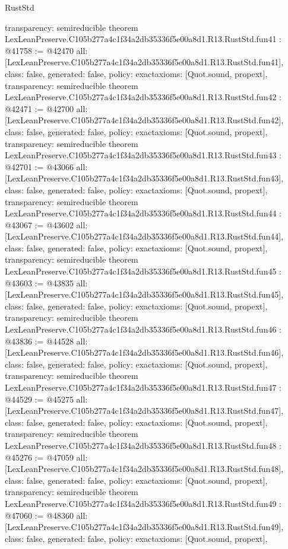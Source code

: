 \begin{lexlean}{RustStd}
\begin{coremodule}
{  transparency: semireducible
}
theorem LexLeanPreserve.C105b277a4c1f34a2db35336f5e00a8d1.R13.RustStd.fun41 : @41758 := @42470 {
  all: [LexLeanPreserve.C105b277a4c1f34a2db35336f5e00a8d1.R13.RustStd.fun41],
  class: false,
  generated: false,
  policy: exact{axioms: [Quot.sound, propext]},
  transparency: semireducible
}
theorem LexLeanPreserve.C105b277a4c1f34a2db35336f5e00a8d1.R13.RustStd.fun42 : @42471 := @42700 {
  all: [LexLeanPreserve.C105b277a4c1f34a2db35336f5e00a8d1.R13.RustStd.fun42],
  class: false,
  generated: false,
  policy: exact{axioms: [Quot.sound, propext]},
  transparency: semireducible
}
theorem LexLeanPreserve.C105b277a4c1f34a2db35336f5e00a8d1.R13.RustStd.fun43 : @42701 := @43066 {
  all: [LexLeanPreserve.C105b277a4c1f34a2db35336f5e00a8d1.R13.RustStd.fun43],
  class: false,
  generated: false,
  policy: exact{axioms: [Quot.sound, propext]},
  transparency: semireducible
}
theorem LexLeanPreserve.C105b277a4c1f34a2db35336f5e00a8d1.R13.RustStd.fun44 : @43067 := @43602 {
  all: [LexLeanPreserve.C105b277a4c1f34a2db35336f5e00a8d1.R13.RustStd.fun44],
  class: false,
  generated: false,
  policy: exact{axioms: [Quot.sound, propext]},
  transparency: semireducible
}
theorem LexLeanPreserve.C105b277a4c1f34a2db35336f5e00a8d1.R13.RustStd.fun45 : @43603 := @43835 {
  all: [LexLeanPreserve.C105b277a4c1f34a2db35336f5e00a8d1.R13.RustStd.fun45],
  class: false,
  generated: false,
  policy: exact{axioms: [Quot.sound, propext]},
  transparency: semireducible
}
theorem LexLeanPreserve.C105b277a4c1f34a2db35336f5e00a8d1.R13.RustStd.fun46 : @43836 := @44528 {
  all: [LexLeanPreserve.C105b277a4c1f34a2db35336f5e00a8d1.R13.RustStd.fun46],
  class: false,
  generated: false,
  policy: exact{axioms: [Quot.sound, propext]},
  transparency: semireducible
}
theorem LexLeanPreserve.C105b277a4c1f34a2db35336f5e00a8d1.R13.RustStd.fun47 : @44529 := @45275 {
  all: [LexLeanPreserve.C105b277a4c1f34a2db35336f5e00a8d1.R13.RustStd.fun47],
  class: false,
  generated: false,
  policy: exact{axioms: [Quot.sound, propext]},
  transparency: semireducible
}
theorem LexLeanPreserve.C105b277a4c1f34a2db35336f5e00a8d1.R13.RustStd.fun48 : @45276 := @47059 {
  all: [LexLeanPreserve.C105b277a4c1f34a2db35336f5e00a8d1.R13.RustStd.fun48],
  class: false,
  generated: false,
  policy: exact{axioms: [Quot.sound, propext]},
  transparency: semireducible
}
theorem LexLeanPreserve.C105b277a4c1f34a2db35336f5e00a8d1.R13.RustStd.fun49 : @47060 := @48360 {
  all: [LexLeanPreserve.C105b277a4c1f34a2db35336f5e00a8d1.R13.RustStd.fun49],
  class: false,
  generated: false,
  policy: exact{axioms: [Quot.sound, propext]},
}
\end{coremodule}
\end{lexlean}
